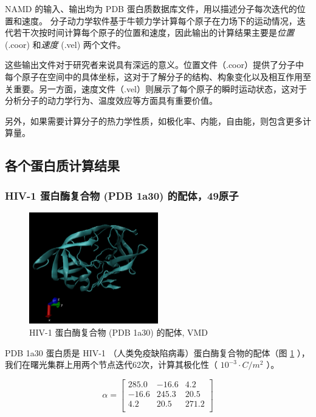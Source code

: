 NAMD 的输入、输出均为 PDB 蛋白质数据库文件，用以描述分子每次迭代的位置和速度。
分子动力学软件基于牛顿力学计算每个原子在力场下的运动情况，迭代若干次按时间计算每个原子的位置和速度，因此输出的计算结果主要是\textit{位置} (.coor) 和\textit{速度} (.vel) 两个文件。

这些输出文件对于研究者来说具有深远的意义。位置文件（.coor）提供了分子中每个原子在空间中的具体坐标，这对于了解分子的结构、构象变化以及相互作用至关重要。另一方面，速度文件（.vel）则展示了每个原子的瞬时运动状态，这对于分析分子的动力学行为、温度效应等方面具有重要价值。

另外，如果需要计算分子的热力学性质，如极化率、内能，自由能，则包含更多计算量。


\subsection{各个蛋白质计算结果}

\subsubsection{HIV-1 蛋白酶复合物 (PDB 1a30) 的配体，49原子}

\begin{figure}[h]
    \centering
    \includegraphics[width=0.5\textwidth]{images/1A30.png}
    \caption{HIV-1 蛋白酶复合物 (PDB 1a30) 的配体, VMD}
    \label{fig:1a30}
\end{figure}


PDB 1a30 蛋白质是 HIV-1 （人类免疫缺陷病毒）蛋白酶复合物的配体（图 \ref{fig:1a30} ），我们在曙光集群上用两个节点迭代62次，计算其极化性（ $ 10^{-3} \cdot C/m^2$ ）。


\begin{equation}
    \alpha = \begin{bmatrix}
        285.0 & -16.6 & 4.2   \\
        -16.6 & 245.3 & 20.5  \\
        4.2   & 20.5  & 271.2 \\
    \end{bmatrix}
\end{equation}



